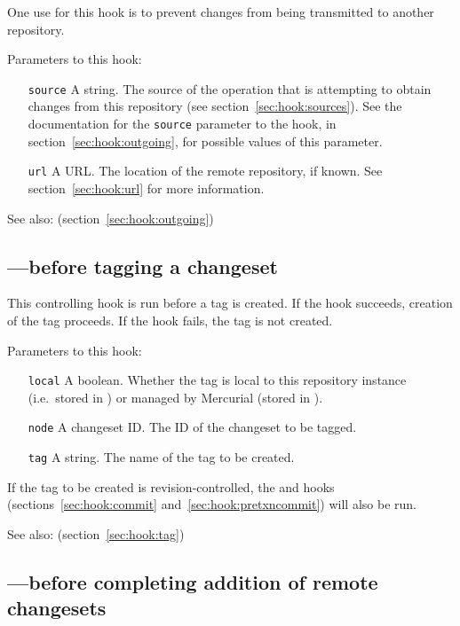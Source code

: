 One use for this hook is to prevent changes from being transmitted to
another repository.

Parameters to this hook:
\begin{itemize}
\item[\texttt{source}] A string.  The source of the operation that is
  attempting to obtain changes from this repository (see
  section~\ref{sec:hook:sources}).  See the documentation for the
  \texttt{source} parameter to the  hook, in
  section~\ref{sec:hook:outgoing}, for possible values of this
  parameter.
\item[\texttt{url}] A URL.  The location of the remote repository, if
  known.  See section~\ref{sec:hook:url} for more information.
\end{itemize}

See also:  (section~\ref{sec:hook:outgoing})

\subsection{---before tagging a changeset}
\label{sec:hook:pretag}

This controlling hook is run before a tag is created.  If the hook
succeeds, creation of the tag proceeds.  If the hook fails, the tag is
not created.

Parameters to this hook:
\begin{itemize}
\item[\texttt{local}] A boolean.  Whether the tag is local to this
  repository instance (i.e.~stored in ) or
  managed by Mercurial (stored in ).
\item[\texttt{node}] A changeset ID.  The ID of the changeset to be tagged.
\item[\texttt{tag}] A string.  The name of the tag to be created.
\end{itemize}

If the tag to be created is revision-controlled, the 
and  hooks (sections~\ref{sec:hook:commit}
and~\ref{sec:hook:pretxncommit}) will also be run.

See also:  (section~\ref{sec:hook:tag})

\subsection{---before completing addition of
  remote changesets}
\label{sec:hook:pretxnchangegroup}

